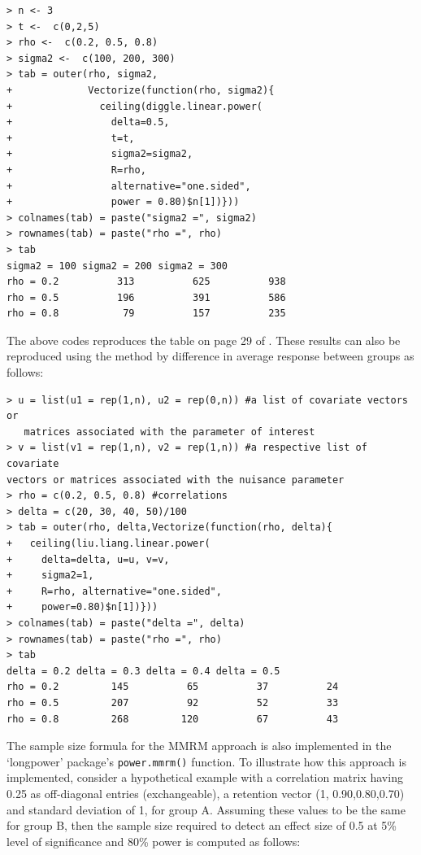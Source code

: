 \begin{mdframed}
\begin{verbatim}
> n <- 3
> t <-  c(0,2,5)
> rho <-  c(0.2, 0.5, 0.8)
> sigma2 <-  c(100, 200, 300)
> tab = outer(rho, sigma2,
+             Vectorize(function(rho, sigma2){
+               ceiling(diggle.linear.power(
+                 delta=0.5,
+                 t=t,
+                 sigma2=sigma2,
+                 R=rho,
+                 alternative="one.sided",
+                 power = 0.80)$n[1])}))
> colnames(tab) = paste("sigma2 =", sigma2)
> rownames(tab) = paste("rho =", rho)
> tab
sigma2 = 100 sigma2 = 200 sigma2 = 300
rho = 0.2          313          625          938
rho = 0.5          196          391          586
rho = 0.8           79          157          235
\end{verbatim}
\end{mdframed}
The above codes reproduces the table on page 29 of \cite{Diggle_etal(2002)}. These results can also be reproduced using the method by \cite{Liu_Liang(1997)} difference in average response between groups as follows:
\begin{mdframed}
	\begin{verbatim}
> u = list(u1 = rep(1,n), u2 = rep(0,n)) #a list of covariate vectors or 
   matrices associated with the parameter of interest
> v = list(v1 = rep(1,n), v2 = rep(1,n)) #a respective list of covariate 
vectors or matrices associated with the nuisance parameter
> rho = c(0.2, 0.5, 0.8) #correlations
> delta = c(20, 30, 40, 50)/100
> tab = outer(rho, delta,Vectorize(function(rho, delta){
+   ceiling(liu.liang.linear.power(
+     delta=delta, u=u, v=v,
+     sigma2=1,
+     R=rho, alternative="one.sided",
+     power=0.80)$n[1])}))
> colnames(tab) = paste("delta =", delta)
> rownames(tab) = paste("rho =", rho)
> tab
delta = 0.2 delta = 0.3 delta = 0.4 delta = 0.5
rho = 0.2         145          65          37          24
rho = 0.5         207          92          52          33
rho = 0.8         268         120          67          43
	\end{verbatim}
\end{mdframed}

The sample size formula for the MMRM approach is also implemented in the `longpower' package's \texttt{power.mmrm()} function. To illustrate how this approach is implemented, consider a hypothetical example with a correlation matrix having 0.25 as off-diagonal entries (exchangeable), a retention vector (1, 0.90,0.80,0.70) and standard deviation of 1, for group A. Assuming these values to be the same for group B, then the sample size required to detect an effect size of 0.5 at 5\% level of significance and 80\% power is computed as follows:

